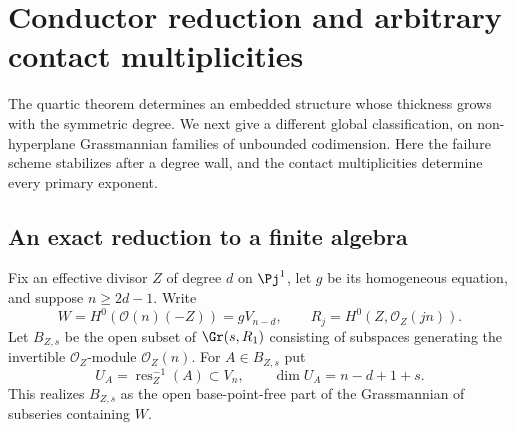 \section{Conductor reduction and arbitrary contact multiplicities}
\label{sec:conductor-primary}
The quartic theorem determines an embedded structure whose thickness
grows with the symmetric degree. We next give a different global
classification, on non-hyperplane Grassmannian families of unbounded
codimension. Here the failure scheme stabilizes after a degree wall,
and the contact multiplicities determine every primary exponent.

\subsection{An exact reduction to a finite algebra}
Fix an effective divisor $Z$ of degree $d$ on $\Pj^1$, let $g$ be
its homogeneous equation, and suppose $n\ge2d-1$. Write
\[
 W=H^0(\mathcal O(n)(-Z))=gV_{n-d},\qquad
 R_j=H^0(Z,\mathcal O_Z(jn)).
\]
Let $B_{Z,s}$ be the open subset of $\Gr(s,R_1)$ consisting of
subspaces generating the invertible $\mathcal O_Z$-module
$\mathcal O_Z(n)$. For $A\in B_{Z,s}$ put
\[
 U_A=\operatorname{res}_Z^{-1}(A)\subset V_n,
 \qquad \dim U_A=n-d+1+s.
\]
This realizes $B_{Z,s}$ as the open base-point-free part of the
Grassmannian of subseries containing $W$.

